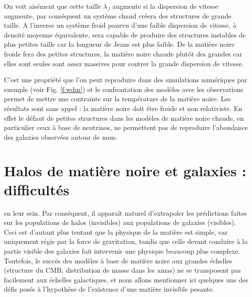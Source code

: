 On voit aisément que cette taille $\lambda_J$ augmente si la dispersion de vitesse augmente, par conséquent un système chaud créera des structures de grande taille. A l'inverse un système froid pourvu d'une faible dispersion de vitesse, à densité moyenne équivalente, sera capable de produire des structures instables de plus petites taille car la longueur de Jeans est plus faible. De la matière noire froide fera des petites structures, la matière noire  chaude plutôt des grandes car elles sont seules sont assez massives pour contrer la grande dispersion de vitesse. 

C'est une propriété que l'on peut reproduire dans des simulations numériques par exemple (voir Fig. \ref{f:wdm}) et le confrontation des modèles avec les observations permet de mettre une contrainte sur la température de la matière noire. Les résultats sont sans appel : la matière noire doit être froide et non relativiste. En effet le défaut de petites structures dans les modèles de matière noire chaude, en particulier ceux à base de neutrinos, ne permettent pas de reproduire l'abondance des galaxies observées autour de nous.

\section{Halos de matière noire et galaxies : difficultés}
 en leur sein. Par conséquent, il apparaît naturel d'extrapoler les prédictions faites sur les populations de halos (invisibles) aux populations de galaxies (visibles). Ceci est d'autant plus tentant que la physique de la matière est simple, car uniquement régie par la force de gravitation, tandis que celle devant conduire à la partie visible des galaxies fait intervenir une physique beaucoup plus complexe. Toutefois, le succès des modèles à base de matière noire aux grandes échelles (structure du CMB, distribution de masse dans les amas) ne se transposent pas facilement aux échelles galactiques, et nous allons mentionner ici quelques uns des défis posés à l'hypothèse de l'existence d'une matière invisible pesante.

